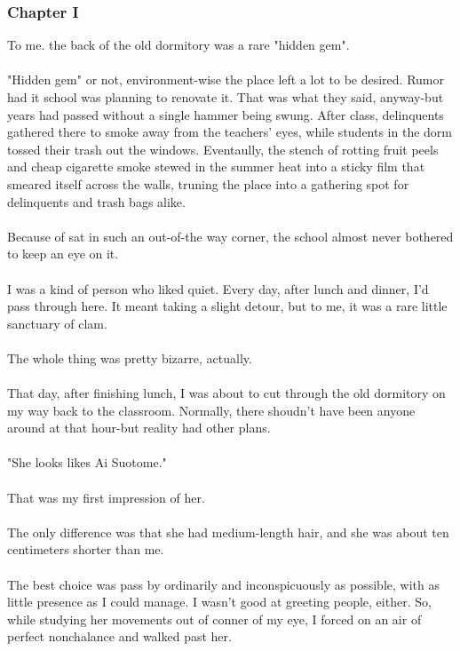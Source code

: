 \documentclass[10pt,a4paper]{article}
\begin{document}
\subsubsection{Chapter I}
To me. the back of the old dormitory was a rare "hidden gem".
\\
\\
"Hidden gem" or not, environment-wise the place left a lot to be desired. Rumor had it school was planning to renovate it. That was what they said, anyway-but years had passed without a single hammer being swung. After class, delinquents gathered there to smoke away from the teachers' eyes, while students in the dorm tossed their trash out the windows. Eventaully, the stench of rotting fruit peels and cheap cigarette smoke stewed in the summer heat into a sticky film that smeared itself across the walls, truning the place into a gathering spot for delinquents and trash bags alike.
\\
\\
Because of sat in such an out-of-the way corner, the school almost never bothered to keep an eye on it.
\\
\\
I was a kind of person who liked quiet. Every day, after lunch and dinner, I'd pass through here. It meant taking a slight detour, but to me, it was a rare little sanctuary of clam.
\\
\\
The whole thing was pretty bizarre, actually.
\\
\\
That day, after finishing lunch, I was about to cut through the old dormitory on my way back to the classroom. Normally, there shoudn't have been anyone around at that hour-but reality had other plans.
\\
\\
"She looks likes Ai Suotome."
\\
\\
That was my first impression of her.
\\
\\
The only difference was that she had medium-length hair, and she was about ten centimeters shorter than me.
\\
\\
The best choice was pass by ordinarily and inconspicuously as possible, with as little presence as I could manage. I wasn't good at greeting people, either. So, while studying her movements out of conner of my eye, I forced on an air of perfect nonchalance and walked past her.
\\
\end{document}
